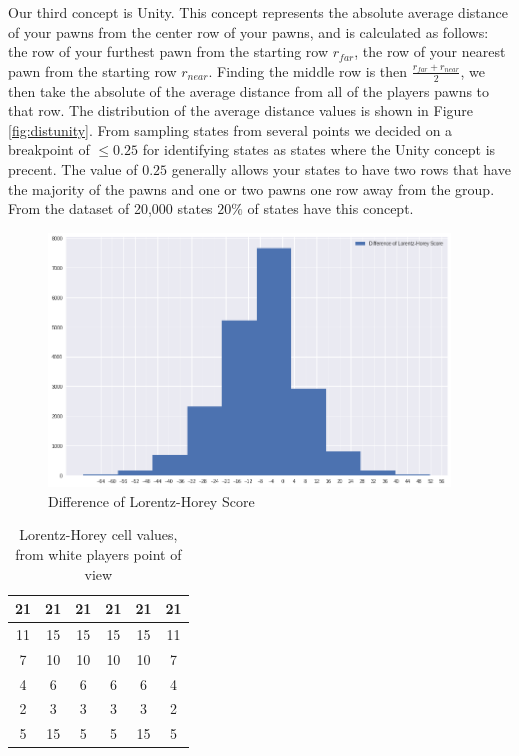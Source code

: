 Our third concept is Unity. This concept represents the absolute average distance of your pawns from the center row of your pawns, and is calculated as follows: the row of your furthest pawn from the starting row $r_{far}$, the row of your nearest pawn from the starting row $r_{near}$. Finding the middle row is then $\frac{r_{far} + r_{near}}{2}$, we then take the absolute of the average distance from all of the players pawns to that row. The distribution of the average distance values is shown in Figure \ref{fig:distunity}. From sampling states from several points we decided on a breakpoint of $\le 0.25$ for identifying states as states where the Unity concept is precent. The value of $0.25$ generally allows your states to have two rows that have the majority of the pawns and one or two pawns one row away from the group. From the dataset of 20,000 states $20\%$ of states have this concept.

\begin{figure}
    \begin{small}
        \begin{center}
            \includegraphics[width=0.95\textwidth]{graphics/dist_lorentz}
        \end{center}
        \caption{Difference of Lorentz-Horey Score}
        \label{fig:distlorentz}
    \end{small}
\end{figure}

\begin{table}[]
    \centering
    \begin{tabular}{|c|c|c|c|c|c|}
        \hline
        21 & 21 & 21 & 21 & 21 & 21 \\\hline
        11 & 15 & 15 & 15 & 15 & 11 \\\hline
        7  & 10 & 10 & 10 & 10 & 7  \\\hline
        4  & 6  & 6  & 6  & 6  & 4  \\\hline
        2  & 3  & 3  & 3  & 3  & 2  \\\hline
        5  & 15 & 5  & 5  & 15 & 5  \\\hline
    \end{tabular}
    \caption{Lorentz-Horey cell values, from white players point of view}
    \label{table:lorentzcell}
\end{table}

